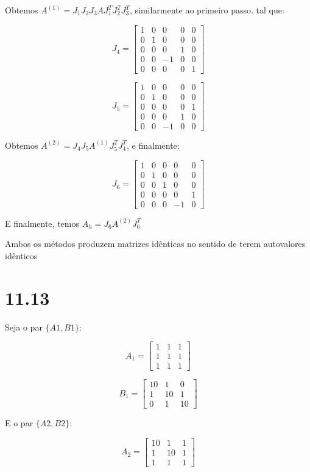 \documentclass[11pt]{report}
\begin{document}
Obtemos $A^{(1)} = J_1J_2J_3AJ_1^TJ_2^TJ_3^T$, similarmente ao primeiro passo. tal que:

\[
J_4= \begin{bmatrix}
1 & 0 & 0 & 0 & 0 \\
0 & 1 & 0 & 0 & 0 \\
0 & 0 & 0 & 1 & 0 \\
0 & 0 & -1 & 0 & 0 \\
0 & 0 & 0 & 0 & 1 
\end{bmatrix}
\]

\[
J_5= \begin{bmatrix}
1 & 0 & 0 & 0 & 0 \\
0 & 1 & 0 & 0 & 0 \\
0 & 0 & 0 & 0 & 1 \\
0 & 0 & 0 & 1 & 0 \\
0 & 0 & -1 & 0 & 0 
\end{bmatrix}
\]


Obtemos $A^{(2)} = J_4J_5A^{(1)}J_5^TJ_4^T$, e finalmente:

\[
J_6= \begin{bmatrix}
1 & 0 & 0 & 0 & 0 \\
0 & 1 & 0 & 0 & 0 \\
0 & 0 & 1 & 0 & 0 \\
0 & 0 & 0 & 0 & 1 \\
0 & 0 & 0 & -1 & 0 
\end{bmatrix}
\]

E finalmente, temos $A_h = J_6A^{(2)}J_6^T$

Ambos os métodos produzem matrizes idênticas no sentido de terem autovalores idênticos

\chapter*{11.13}
Seja o par $\{A1,B1\}$:

\[
A_1 = \begin{bmatrix}
1 & 1 & 1\\
1 & 1 & 1\\
1 & 1 & 1
\end{bmatrix}
\]

\[
B_1 = \begin{bmatrix}
10 & 1 & 0\\
1 & 10 & 1\\
0 & 1 & 10
\end{bmatrix}
\]

E o par $\{A2,B2\}$:

\[
A_2 = \begin{bmatrix}
10 & 1 & 1\\
1 & 10 & 1\\
1 & 1 & 1
\end{bmatrix}
\]
\end{document}
